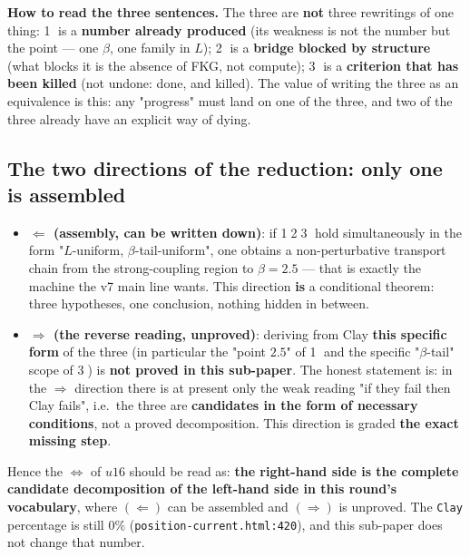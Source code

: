 \documentclass[11pt,a4paper]{article}
\newcommand{\lvM}{\textcolor{cM}{\textbf{the exact missing step}}}
\newcommand{\bet}{\beta}
\begin{document}
\noindent\textbf{How to read the three sentences.} The three are \textbf{not} three rewritings of one thing:
\textcircled{\small1} is a \textbf{number already produced} (its weakness is not the number but the point --- one $\bet$, one family in $L$);
\textcircled{\small2} is a \textbf{bridge blocked by structure} (what blocks it is the absence of FKG, not compute);
\textcircled{\small3} is a \textbf{criterion that has been killed} (not undone: done, and killed). The value of writing the three as an equivalence is this: any "progress" must land on one of the three, and two of the three already have an explicit way of dying.

\subsection{The two directions of the reduction: only one is assembled}

\begin{itemize}[leftmargin=1.5em,itemsep=2pt,topsep=2pt]
  \item \textbf{$\Longleftarrow$ (assembly, can be written down)}: if \textcircled{\small1}\textcircled{\small2}\textcircled{\small3} hold simultaneously in the form "$L$-uniform, $\bet$-tail-uniform", one obtains a non-perturbative transport chain from the strong-coupling region to $\bet=2.5$ --- that is exactly the machine the v7 main line wants. This direction \textbf{is} a conditional theorem: three hypotheses, one conclusion, nothing hidden in between.
  \item \textbf{$\Longrightarrow$ (the reverse reading, unproved)}: deriving from Clay \textbf{this specific form} of the three (in particular the "point $2.5$" of \textcircled{\small1} and the specific "${\bet}$-tail" scope of \textcircled{\small3}) is \textbf{not proved in this sub-paper}. The honest statement is: in the $\Longrightarrow$ direction there is at present only the weak reading "if they fail then Clay fails", i.e.\ the three are \textbf{candidates in the form of necessary conditions}, not a proved decomposition. This direction is graded \lvM.
\end{itemize}

\noindent Hence the $\Longleftrightarrow$ of $u16$ should be read as: \textbf{the right-hand side is the complete candidate decomposition of the left-hand side in this round's vocabulary}, where $(\Longleftarrow)$ can be assembled and $(\Longrightarrow)$ is unproved. The \texttt{Clay} percentage is still $0\%$ (\texttt{position-current.html:420}), and this sub-paper does not change that number.
\end{document}
